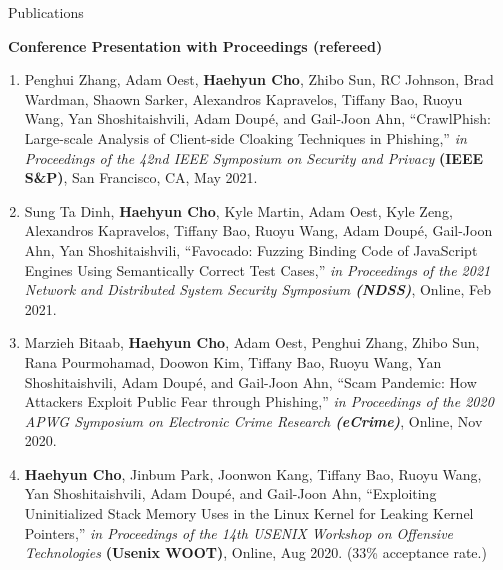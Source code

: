 \documentclass{resume} %
\begin{document}

\begin{rSection}{\faGenderless~Publications}

    \strut\textbullet~{\bf Conference Presentation with Proceedings (refereed)}
    \begin{enumerate}[leftmargin=0pt]

    	\item Penghui Zhang, Adam Oest, \textbf{Haehyun Cho}, Zhibo Sun, RC Johnson, Brad Wardman, Shaown Sarker, Alexandros Kapravelos, Tiffany Bao, Ruoyu Wang, Yan Shoshitaishvili, Adam Doup\'e, and Gail-Joon Ahn,
    	``CrawlPhish: Large-scale Analysis of Client-side Cloaking Techniques in Phishing,''
        \emph{in Proceedings of the 42nd IEEE Symposium on Security and Privacy} \textbf{(IEEE S\&P)},
    	San Francisco, CA, May 2021.

    	\item Sung Ta Dinh, \textbf{Haehyun Cho}, Kyle Martin, Adam Oest, Kyle Zeng, Alexandros Kapravelos, Tiffany Bao, Ruoyu Wang, Adam Doup\'e, Gail-Joon Ahn, Yan Shoshitaishvili,
        ``Favocado: Fuzzing Binding Code of JavaScript Engines Using Semantically Correct Test Cases,''
        \emph{in Proceedings of the 2021 Network and Distributed System Security Symposium \textbf{(NDSS)}},
        Online, Feb 2021.

        \item Marzieh Bitaab, \textbf{Haehyun Cho}, Adam Oest, Penghui Zhang, Zhibo Sun, Rana Pourmohamad, Doowon Kim, Tiffany Bao, Ruoyu Wang, Yan Shoshitaishvili, Adam Doup\'e, and Gail-Joon Ahn,
        ``Scam Pandemic: How Attackers Exploit Public Fear through Phishing,''
        \emph{in Proceedings of the 2020 APWG Symposium on Electronic Crime Research \textbf{(eCrime)}},
        Online, Nov 2020.

        \item \textbf{Haehyun Cho}, Jinbum Park, Joonwon Kang, Tiffany Bao, Ruoyu Wang, Yan Shoshitaishvili, Adam Doup\'e, and Gail-Joon Ahn,
        ``Exploiting Uninitialized Stack Memory Uses in the Linux Kernel for Leaking Kernel Pointers,''
        \emph{in Proceedings of the 14th USENIX Workshop on Offensive Technologies} \textbf{(Usenix WOOT)},
        Online, Aug 2020.
        (33\% acceptance rate.)


\end{enumerate}
\end{rSection}
\end{document}
